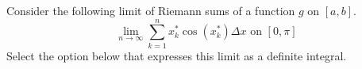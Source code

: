 \documentclass{ximera}
\author{Nela Lakos \and Kyle Parsons}
\begin{document}
\begin{exercise}

Consider the following limit of Riemann sums of a function $g$ on $[a,b]$.
\[
\lim_{n\to\infty}\sum_{k=1}^n x_k^* \cos(x_k^*) \Delta x \text{ on } [0,\pi]
\]
Select the option below that expresses this limit as a definite integral.

\begin{multipleChoice}
\end{multipleChoice}

\end{exercise}
\end{document}
